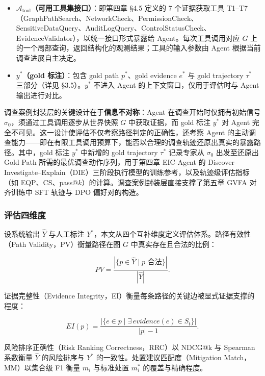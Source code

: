 \documentclass[a4paper,12pt]{ctexart}
\begin{document}
\begin{itemize}[leftmargin=*]
\item \textbf{$\mathcal{A}_{\text{tool}}$（可用工具集接口）}：即第四章 §4.5 定义的 7 个证据获取工具 T1–T7（GraphPathSearch、NetworkCheck、PermissionCheck、SensitiveDataQuery、AuditLogQuery、ControlStatusCheck、EvidenceValidator），以统一接口形式暴露给 Agent。每次工具调用对应 $G$ 上的一个局部查询，返回结构化的观测结果；工具的输入参数由 Agent 根据当前调查进展自主决定。
\end{itemize}

\begin{itemize}[leftmargin=*]
\item \textbf{$y^*$（gold 标注）}：包含 gold path $p^*$、gold evidence $e^*$ 与 gold trajectory $\tau^*$ 三部分（详见 §3.5）。$y^*$ 不进入 Agent 的上下文窗口，仅用于评估时与 Agent 输出进行对比。
\end{itemize}

调查案例封装层的关键设计在于\textbf{信息不对称}：Agent 在调查开始时仅拥有初始信号 $\sigma_0$，须通过工具调用逐步从世界快照 $G$ 中获取证据，而 gold 标注 $y^*$ 对 Agent 完全不可见。这一设计使评估不仅考察路径判定的正确性，还考察 Agent 的主动调查能力——即在有限工具调用预算下，能否以合理的调查轨迹还原出真实的暴露路径。其中，gold 标注 $y^*$ 中新增的 gold trajectory $\tau^*$ 记录专家从 $\sigma_0$ 出发至还原出 Gold Path 所需的最优调查动作序列，用于第四章 EIC-Agent 的 Discover–Investigate–Explain（DIE）三阶段执行模型的训练参考，以及轨迹级评估指标（如 EQP、CS、pass@$k$）的计算。调查案例封装层直接支撑了第五章 GVFA 对齐训练中 SFT 轨迹与 DPO 偏好对的构造。

\subsubsection{评估四维度}

设系统输出 $\hat{Y}$ 与人工标注 $Y^*$，本文从四个互补维度定义评估体系。路径有效性（Path Validity，PV）衡量路径在图 $G$ 中真实存在且合法的比例：

\[PV = \frac{|\{p \in \hat{Y} \mid p \text{ 合法}\}|}{|\hat{Y}|}.\]

证据完整性（Evidence Integrity，EI）衡量每条路径的关键边被显式证据支撑的程度：

\[EI(p) = \frac{|\{e \in p \mid \exists\,evidence(e)\in S_t\}|}{|p|-1}.\]

风险排序正确性（Risk Ranking Correctness，RRC）以 NDCG@k 与 Spearman 系数衡量 $\hat{Y}$ 的风险排序与 $Y^*$ 的一致性。处置建议匹配度（Mitigation Match，MM）以集合级 F1 衡量 $m_i$ 与标准处置 $m_i^*$ 的覆盖与精确程度。
\end{document}
